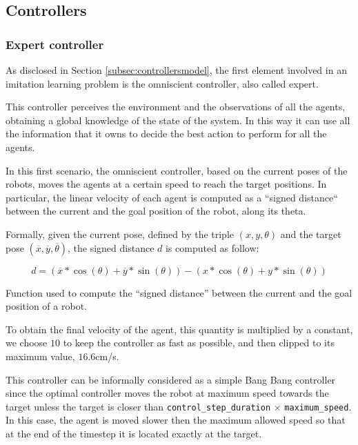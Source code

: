 \subsection{Controllers}
\label{subsec:task1controllers}

\subsubsection{Expert controller}
\label{subsubsec:omniscient}

As disclosed in Section \ref{subsec:controllersmodel}, the first element involved in 
an imitation learning problem is the omniscient controller, also called expert.

This controller perceives the environment and the observations of all the agents, 
obtaining a global knowledge of the state of the system. In this way it can use all 
the information that it owns to decide the best action to perform for all the 
agents. 

In this first scenario, the omniscient controller, based on the current poses of the 
robots, moves the agents at a certain speed to reach the target positions. In 
particular, the linear velocity of each agent is computed as a ``signed distance`` 
between the current and the goal position of the robot, along its theta. 

Formally, given the current pose, defined by the triple $(x, y, \theta)$ and the 
target pose $(\overline x, \overline y, \overline \theta)$, the signed distance $d$ 
is computed as follow:
\begin{Equation}[!htb]
	\centering
	\begin{equation}
	d = \left(\overline x * \cos (\theta) + \overline y * \sin (\theta)\right) -
	\left( x * \cos (\theta) + y * \sin (\theta)\right)
	\end{equation}
	\caption[Signed distance function.]{Function used to compute the ``signed 
	distance'' between the current and the goal position of a robot.}
	\label{eq:signeddist}
\end{Equation}

\noindent
To obtain the final velocity of the agent, this quantity is multiplied by a constant, 
we choose $10$ to keep the controller as fast as possible, and then clipped to its 
maximum value, $16.6$\gls{cm/s}.

This controller can be informally considered as a simple Bang Bang controller 
since the optimal controller moves the robot at maximum speed towards the 
target unless the target is closer than \texttt{control\_step\_duration} $\times$ 
\texttt{maximum\_speed}. In this case, the agent is moved slower then the 
maximum allowed speed so that at the end of the timestep it is located exactly at 
the target.


